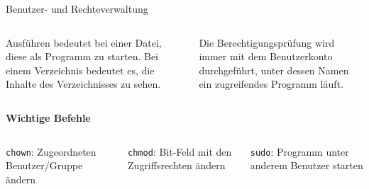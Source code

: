 {\begin{frame}[allowframebreaks]{Benutzer- und Rechteverwaltung}
\begin{columns}[onlytextwidth]
{            \bigskip

            \glqq{}Ausführen\grqq{} bedeutet bei einer Datei, diese als Programm
            zu starten. Bei einem Verzeichnis bedeutet es, die Inhalte des
            Verzeichnisses zu sehen.

            \bigskip

            Die Berechtigungsprüfung wird immer mit dem Benutzerkonto durchgeführt,
            unter dessen Namen ein zugreifendes Programm läuft.
        }
    \end{columns}

    \medskip
    \textbf{Wichtige Befehle}
    \smallskip

    \begin{columns}[onlytextwidth]
        \texttt{chown}: Zugeordneten Benutzer/Gruppe ändern

        \texttt{chmod}: Bit-Feld mit den Zugriffsrechten ändern

        \texttt{sudo}: Programm unter anderem Benutzer starten
    \end{columns}

\end{frame}
}









